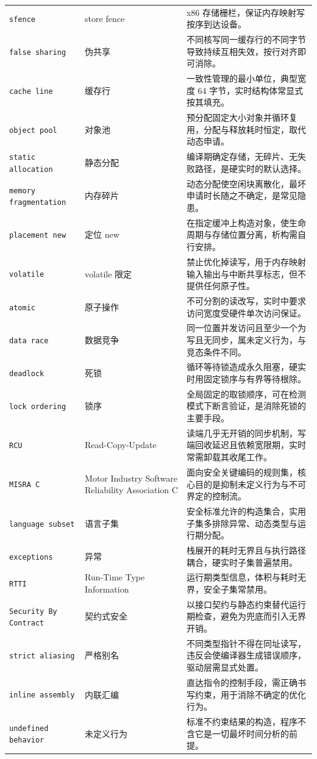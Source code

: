 \documentclass[12pt,a4paper,fontset=fandol]{ctexbook}
\newcommand{\Tp}[1]{\texttt{#1}}
\begin{document}
\begin{longtable}{@{} >{\raggedright\arraybackslash}p{} >{\raggedright\arraybackslash}p{} >{\raggedright\arraybackslash}p{}@{}}
\Tp{sfence} & store fence & x86 存储栅栏，保证内存映射写按序到达设备。 \\
\Tp{false sharing} & 伪共享 & 不同核写同一缓存行的不同字节导致持续互相失效，按行对齐即可消除。 \\
\Tp{cache line} & 缓存行 & 一致性管理的最小单位，典型宽度 64 字节，实时结构体常显式按其填充。 \\
\Tp{object pool} & 对象池 & 预分配固定大小对象并循环复用，分配与释放耗时恒定，取代动态申请。 \\
\Tp{static allocation} & 静态分配 & 编译期确定存储，无碎片、无失败路径，是硬实时的默认选择。 \\
\Tp{memory fragmentation} & 内存碎片 & 动态分配使空闲块离散化，最坏申请时长随之不确定，是常见隐患。 \\
\Tp{placement new} & 定位 new & 在指定缓冲上构造对象，使生命周期与存储位置分离，析构需自行安排。 \\
\Tp{volatile} & volatile 限定 & 禁止优化掉读写，用于内存映射输入输出与中断共享标志，但不提供任何原子性。 \\
\Tp{atomic} & 原子操作 & 不可分割的读改写，实时中要求访问宽度受硬件单次访问保证。 \\
\Tp{data race} & 数据竞争 & 同一位置并发访问且至少一个为写且无同步，属未定义行为，与竞态条件不同。 \\
\Tp{deadlock} & 死锁 & 循环等待锁造成永久阻塞，硬实时用固定锁序与有界等待根除。 \\
\Tp{lock ordering} & 锁序 & 全局固定的取锁顺序，可在检测模式下断言验证，是消除死锁的主要手段。 \\
\Tp{RCU} & Read-Copy-Update & 读端几乎无开销的同步机制，写端回收延迟且依赖宽限期，实时常需卸载其收尾工作。 \\
\Tp{MISRA C} & Motor Industry Software Reliability Association C & 面向安全关键编码的规则集，核心目的是抑制未定义行为与不可界定的控制流。 \\
\Tp{language subset} & 语言子集 & 安全标准允许的构造集合，实用子集多排除异常、动态类型与运行期分配。 \\
\Tp{exceptions} & 异常 & 栈展开的耗时无界且与执行路径耦合，硬实时子集普遍禁用。 \\
\Tp{RTTI} & Run-Time Type Information & 运行期类型信息，体积与耗时无界，安全子集常禁用。 \\
\Tp{Security By Contract} & 契约式安全 & 以接口契约与静态约束替代运行期检查，避免为兜底而引入无界开销。 \\
\Tp{strict aliasing} & 严格别名 & 不同类型指针不得在同址读写，违反会使编译器生成错误顺序，驱动层需显式处置。 \\
\Tp{inline assembly} & 内联汇编 & 直达指令的控制手段，需正确书写约束，用于消除不确定的优化行为。 \\
\Tp{undefined behavior} & 未定义行为 & 标准不约束结果的构造，程序不含它是一切最坏时间分析的前提。 \\
\end{longtable}
\end{document}
